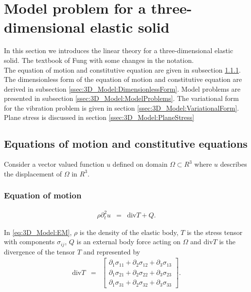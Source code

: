 \documentclass[../../main.tex]{subfiles}
\begin{document}
\section{Model problem for a three-dimensional elastic solid} \label{sec:3D_Model}
In this section we introduces the linear theory for a three-dimensional elastic solid. The textbook of Fung \cite{Fung65} with some changes in the notation. \\

 The equation of motion and constitutive equation are given in subsection \ref{ssec:3D_Model:EquationOfMotion}. The dimensionless form of the equation of motion and constitutive equation are derived in subsection \ref{ssec:3D_Model:DimensionlessForm}. Model problems are presented in subsection \ref{ssec:3D_Model:ModelProblems}. The variational form for the vibration problem is given in section \ref{ssec:3D_Model:VariationalForm}. Plane stress is discussed in section \ref{ssec:3D_Model:PlaneStress} \\

\subsection{Equations of motion and constitutive equations} \label{ssec:3D_Model:EquationofMotion+ConstitutiveEquation}
Consider a vector valued function $u$ defined on domain $\Omega \subset {R}^3$ where $u$ describes the displacement of $\Omega$ in ${R}^3$.
\subsubsection{Equation of motion}\label{ssec:3D_Model:EquationOfMotion}
\begin{eqnarray}
	\rho\partial_t^2 u & = & \textrm{div}T + Q. \label{eq:3D_Model:EM}
\end{eqnarray}

In \eqref{eq:3D_Model:EM}, $\rho$ is the density of the elastic body, $T$ is the stress tensor with components $\sigma_{ij}$, $Q$ is an external body force acting on $\Omega$ and $\textrm{div}T$ is the divergence of the tensor $T$ and represented by
\begin{eqnarray}
	\textrm{div}  T & = &
	\begin{bmatrix}
		\partial_1 \sigma_{11} + \partial_2 \sigma_{12} + \partial_3 \sigma_{13}\\
		\partial_1 \sigma_{21} + \partial_2 \sigma_{22} + \partial_3 \sigma_{23}\\
		\partial_1 \sigma_{31} + \partial_2 \sigma_{32} + \partial_3 \sigma_{33}
	\end{bmatrix}. \label{eq:3D_Model:divT}
\end{eqnarray}
\end{document}
